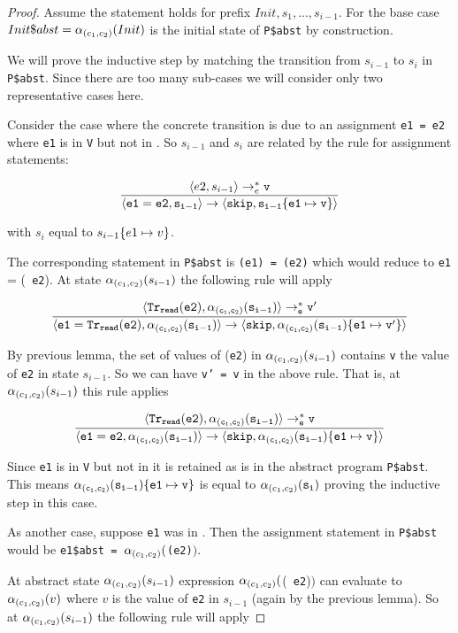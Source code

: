 \begin{proof}

 Assume the statement holds for prefix \(Init, s_1, ...,
 s_{i-1}\). For the base case \(Init\$abst = \alpha_{(c_1,c_2)}(Init)\) is the
 initial state of {\tt P\$abst} by construction.

 We will prove the inductive step by matching the transition from
 \(s_{i-1}\) to \(s_i\) in {\tt P\$abst}. Since there are too many
 sub-cases we will consider only two representative cases here.

 Consider the case where the concrete transition is due to an
 assignment {\tt e1 = e2} where {\tt e1} is in {\tt V}  but not in \indexids. So
 \(s_{i-1}\) and \(s_i\) are related by the rule for assignment
 statements:

\[\frac{\langle e2, s_{i-1} \rangle \rightarrow_{e}^{*} \tt v}{\langle \tt e1 = e2, s_{i-1} \rangle \rightarrow \langle {\bf \tt skip}, s_{i-1}\{e1 \mapsto v\}\rangle}\]

with \(s_i\) equal to \({s_{i-1}\{e1 \mapsto v\}}\).

The corresponding statement in {\tt P\$abst} is {\tt \trwr({\tt e1}) =
  \trrd({\tt e2})} which would reduce to {\tt e1} = \trrd({\tt
  e2}). At state \(\alpha_{(c_1,c_2)}(s_{i-1})\) the following rule will apply

\[\frac{\langle \tt Tr_{read}(e2), \alpha_{(c_1,c_2)}(s_{i-1}) \rangle \rightarrow_{e}^{*} \tt v'}{\langle \tt e1 = Tr_{read}(e2), \alpha_{(c_1,c_2)}(s_{i-1}) \rangle \rightarrow \langle {\bf \tt skip}, \alpha_{(c_1,c_2)}(s_{i-1})\{e1 \mapsto v'\}\rangle}\]

By previous lemma, the set of values of \trrd({\tt e2}) in
\(\alpha_{(c_1,c_2)}(s_{i-1})\) contains {\tt v} the value of {\tt e2} in state
\(s_{i-1}\). So we can have {\tt v' = v} in the above rule. That is, at \(\alpha_{(c_1,c_2)}(s_{i-1})\) this rule applies

\[\frac{\langle \tt Tr_{read}(e2), \alpha_{(c_1,c_2)}(s_{i-1}) \rangle \rightarrow_{e}^{*} \tt v}{\langle \tt e1 = e2, \alpha_{(c_1,c_2)}(s_{i-1}) \rangle \rightarrow \langle {\bf \tt skip}, \alpha_{(c_1,c_2)}(s_{i-1})\{e1 \mapsto v\}\rangle}\]

Since {\tt e1} is in {\tt V} but not in \indexids{} it is retained as is in the
abstract program {\tt P\$abst}. This means \({\tt \alpha_{(c_1,c_2)}(s_{i-1})\{e1 \mapsto v\}}\) is equal to \(\alpha_{(c_1,c_2)}({\tt s_i})\) proving the inductive step in this case.

As another case, suppose {\tt e1} was in \indexids. Then the
assignment statement in {\tt P\$abst} would be {\tt {e1\$abst} =
  \(\alpha_{(c_1,c_2)}(\)\trrd({\tt e2})\()\)}.

At abstract state \(\alpha_{(c_1,c_2)}(s_{i-1})\) expression \(\alpha_{(c_1,c_2)}(\)\trrd({\tt
  e2})\()\) can evaluate to \(\alpha_{(c_1,c_2)}(v)\) where \(v\) is the value of
{\tt e2} in \(s_{i-1}\) (again by the previous lemma). So at \(\alpha_{(c_1,c_2)}(s_{i-1})\) the following rule will apply


\end{proof}
